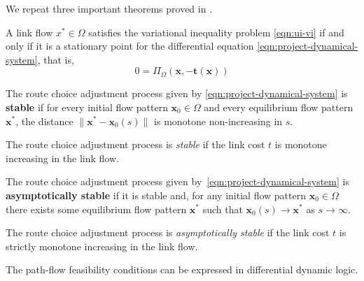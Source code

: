 We repeat three important theorems proved in \citet{nagurney1997projected}.

\begin{theorem}
    \label{thm:correspondence}
    A link flow $x^*\in \Omega$ satisfies the variational inequality problem \eqref{eqn:ui-vi} if and only if it is a stationary point for the differential equation \eqref{eqn:project-dynamical-system}, that is,
    $$0= \Pi_{\Omega}(\mathbf{x}, -\mathbf{t}(\mathbf{x}))$$
\end{theorem}

\begin{definition}[Stability]
    \label{def:stability}
    The route choice adjustment process given by \eqref{eqn:project-dynamical-system} is \textbf{stable} if for every initial flow pattern $\mathbf{x}_0\in \Omega$ and every equilibrium flow pattern $\mathbf{x}^*$, the distance $\|\mathbf{x}^* - \mathbf{x}_0(s)\|$ is monotone non-increasing in $s$.
\end{definition}

\begin{theorem}
    The route choice adjustment process is \textit{stable} if the link cost $t$ is monotone increasing in the link flow.
\end{theorem}

\begin{definition}
     The route choice adjustment process given by~\eqref{eqn:project-dynamical-system} is \textbf{asymptotically stable} if it is stable and, for any initial flow pattern $\mathbf{x}_0\in \Omega$ there exists some  equilibrium flow pattern $\mathbf{x}^*$ such that $\mathbf{x}_0(s) \to \mathbf{x}^*$ as $s\to \infty$.
\end{definition}

\begin{theorem}\label{thm:convergence}
    The route choice adjustment process is \textit{asymptotically stable} if the link cost $t$ is strictly monotone increasing in the link flow.
\end{theorem}

\begin{lemma}
	The path-flow feasibility conditions can be expressed in differential dynamic logic.
\end{lemma}

